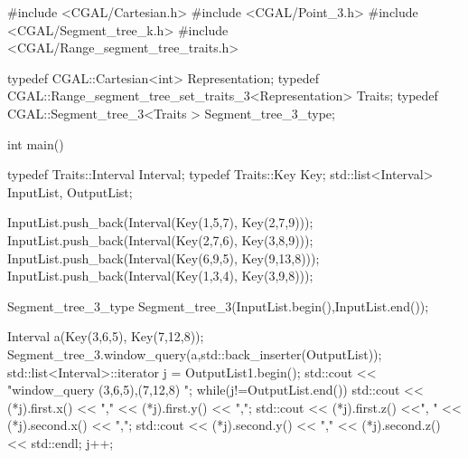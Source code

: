 \begin{cprog}
#include <CGAL/Cartesian.h>
#include <CGAL/Point_3.h>
#include <CGAL/Segment_tree_k.h>
#include <CGAL/Range_segment_tree_traits.h>

typedef CGAL::Cartesian<int> Representation;
typedef CGAL::Range_segment_tree_set_traits_3<Representation> Traits;
typedef CGAL::Segment_tree_3<Traits > Segment_tree_3_type;

int main()
{
  typedef Traits::Interval Interval;
  typedef Traits::Key Key;
  std::list<Interval> InputList, OutputList;

  InputList.push_back(Interval(Key(1,5,7), Key(2,7,9)));
  InputList.push_back(Interval(Key(2,7,6), Key(3,8,9)));
  InputList.push_back(Interval(Key(6,9,5), Key(9,13,8)));
  InputList.push_back(Interval(Key(1,3,4), Key(3,9,8)));
 
  Segment_tree_3_type Segment_tree_3(InputList.begin(),InputList.end());

  Interval a(Key(3,6,5), Key(7,12,8));
  Segment_tree_3.window_query(a,std::back_inserter(OutputList));
  std::list<Interval>::iterator j = OutputList1.begin();
  std::cout << "\n window_query (3,6,5),(7,12,8) \n";
  while(j!=OutputList.end()){
    std::cout << (*j).first.x() << "," << (*j).first.y() << ",";
    std::cout << (*j).first.z() <<", " << (*j).second.x() << ",";
    std::cout << (*j).second.y() << "," << (*j).second.z() << std::endl; 
    j++;
  }
}
\end{cprog}


